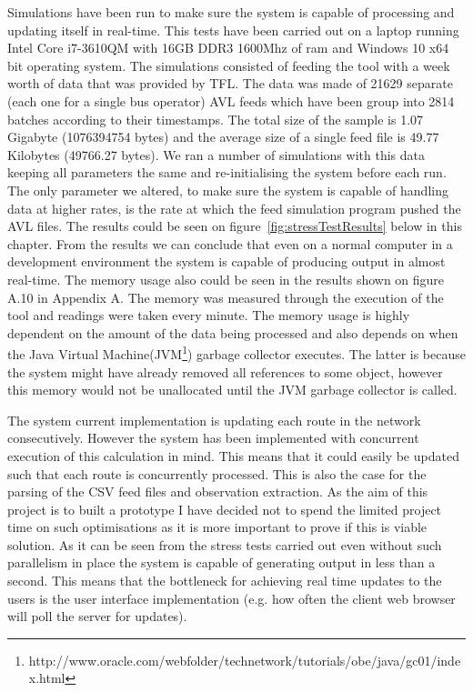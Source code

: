 Simulations have been run to make sure the system is capable of processing and updating itself in real-time. This tests have been carried out on a laptop running Intel Core i7-3610QM with 16GB DDR3 1600Mhz of ram and Windows 10 x64 bit operating system. The simulations consisted of feeding the tool with a week worth of data that was provided by TFL. The data was made of 21629 separate (each one for a single bus operator) AVL feeds which have been group into 2814 batches according to their timestamps. The total size of the sample is 1.07 Gigabyte (1076394754 bytes) and the average size of a single feed file is 49.77 Kilobytes (49766.27 bytes). We ran a number of simulations with this data keeping all parameters the same and re-initialising the system before each run. The only parameter we altered, to make sure the system is capable of handling data at higher rates, is the rate at which the feed simulation program pushed the AVL files. The results could be seen on figure~\ref{fig:stressTestResults} below in this chapter. From the results we can conclude that even on a normal computer in a development environment the system is capable of producing output in almost real-time. The memory usage also could be seen in the results shown on figure A.10 in Appendix A. The memory was measured through the execution of the tool and readings were taken every minute. The memory usage is highly dependent on the amount of the data being processed and also depends on when the Java Virtual Machine(JVM\footnote{http://www.oracle.com/webfolder/technetwork/tutorials/obe/java/gc01/index.html}) garbage collector executes. The latter is because the system might have already removed all references to some object, however this memory would not be unallocated until the JVM garbage collector is called.

The system current implementation is updating each route in the network consecutively. However the system has been implemented with concurrent execution of this calculation in mind. This means that it could easily be updated such that each route is concurrently processed. This is also the case for the parsing of the CSV feed files and observation extraction. As the aim of this project is to built a prototype I have decided not to spend the limited project time on such optimisations as it is more important to prove if this is viable solution. As it can be seen from the stress tests carried out even without such parallelism in place the system is capable of  generating output in less than a second. This means that the bottleneck for achieving real time updates to the users is the user interface implementation (e.g. how often the client web browser will poll the server for updates).

